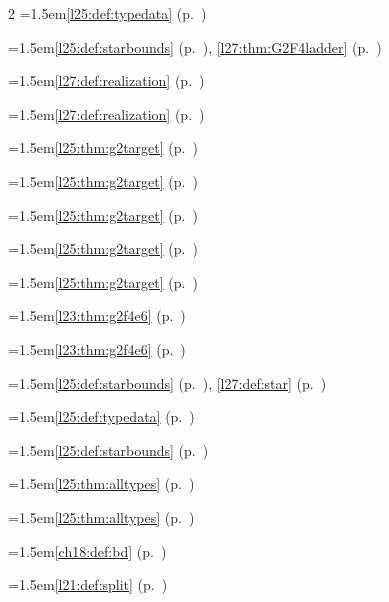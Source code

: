\begin{multicols}{2}
\hangindent=1.5em\quad \ref{l25:def:typedata} (p.~\pageref{l25:def:typedata})\par
\hangindent=1.5em\quad \ref{l25:def:starbounds} (p.~\pageref{l25:def:starbounds}), \ref{l27:thm:G2F4ladder} (p.~\pageref{l27:thm:G2F4ladder})\par
\hangindent=1.5em\quad \ref{l27:def:realization} (p.~\pageref{l27:def:realization})\par
\hangindent=1.5em\quad \ref{l27:def:realization} (p.~\pageref{l27:def:realization})\par
\hangindent=1.5em\quad \ref{l25:thm:g2target} (p.~\pageref{l25:thm:g2target})\par
\hangindent=1.5em\quad \ref{l25:thm:g2target} (p.~\pageref{l25:thm:g2target})\par
\hangindent=1.5em\quad \ref{l25:thm:g2target} (p.~\pageref{l25:thm:g2target})\par
\hangindent=1.5em\quad \ref{l25:thm:g2target} (p.~\pageref{l25:thm:g2target})\par
\hangindent=1.5em\quad \ref{l25:thm:g2target} (p.~\pageref{l25:thm:g2target})\par
\hangindent=1.5em\quad \ref{l23:thm:g2f4e6} (p.~\pageref{l23:thm:g2f4e6})\par
\hangindent=1.5em\quad \ref{l23:thm:g2f4e6} (p.~\pageref{l23:thm:g2f4e6})\par
\hangindent=1.5em\quad \ref{l25:def:starbounds} (p.~\pageref{l25:def:starbounds}), \ref{l27:def:star} (p.~\pageref{l27:def:star})\par
\hangindent=1.5em\quad \ref{l25:def:typedata} (p.~\pageref{l25:def:typedata})\par
\hangindent=1.5em\quad \ref{l25:def:starbounds} (p.~\pageref{l25:def:starbounds})\par
\hangindent=1.5em\quad \ref{l25:thm:alltypes} (p.~\pageref{l25:thm:alltypes})\par
\hangindent=1.5em\quad \ref{l25:thm:alltypes} (p.~\pageref{l25:thm:alltypes})\par
\hangindent=1.5em\quad \ref{ch18:def:bd} (p.~\pageref{ch18:def:bd})\par
\hangindent=1.5em\quad \ref{l21:def:split} (p.~\pageref{l21:def:split})\par

\end{multicols}

